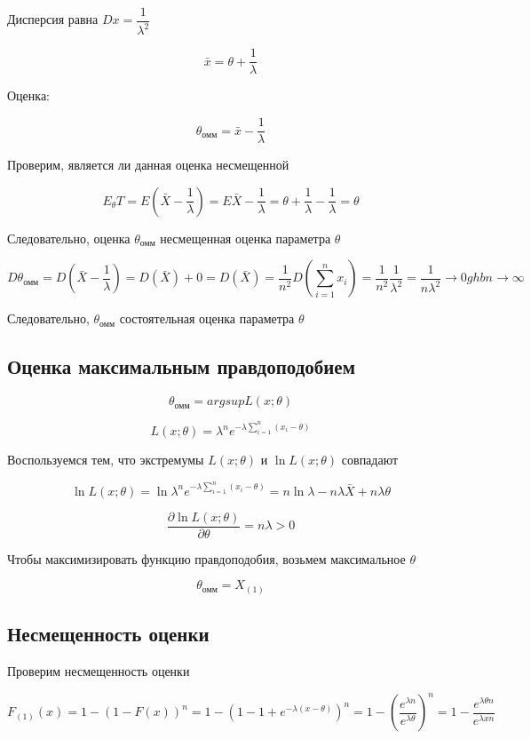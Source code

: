 \documentclass[a4paper,12pt, oneside]{book}
\begin{document}
Дисперсия равна $ Dx = \dfrac{1}{\lambda^2} $

$$
\bar{x} = \theta + \dfrac{1}{\lambda}
$$

Оценка: 

$$
\theta_\text{омм} = \bar x - \dfrac{1}{\lambda}
$$

Проверим, является ли данная оценка несмещенной

$$
E_\theta T = E\left( \bar X - \dfrac{1}{\lambda} \right) = E\bar{X} - \dfrac{1}{\lambda} = \theta + \dfrac{1}{\lambda} - \dfrac{1}{\lambda} = \theta
$$

Следовательно, оценка $ \theta_\text{омм} $ несмещенная оценка параметра $ \theta $

$$
D\theta_\text{омм} = D\left( \bar X - \dfrac{1}{\lambda} \right) = D(\bar{X}) + 0 =  D(\bar{X}) = \dfrac{1}{n^2} D\left( \sum_{i=1}^{n} x_i \right) = \dfrac{1}{n^2} \dfrac{1}{\lambda^2} = \dfrac{1}{n \lambda^2} \to 0 ghb n \to \infty
$$

Следовательно, $ \theta_\text{омм} $ состоятельная оценка параметра $ \theta $
\\

\subsection{Оценка максимальным правдоподобием}

$$
\theta_\text{омм} = argsup L(x; \theta)
$$

$$
L(x;\theta) = \lambda^n e^{-\lambda \sum_{i=1}^n (x_i - \theta)}
$$

Воспользуемся тем, что экстремумы $ L(x; \theta) $ и $ \ln L(x; \theta) $ совпадают

$$
\ln L (x; \theta) = \ln \lambda^n e^{-\lambda \sum_{i=1}^n (x_i - \theta)} = n \ln \lambda - n \lambda \bar{X} + n \lambda \theta 
$$

$$
\dfrac{\partial \ln L(x; \theta)}{\partial \theta} = n \lambda > 0
$$

Чтобы максимизировать функцию правдоподобия, возьмем максимальное $ \theta $

$$
\theta_\text{омм} = X_{(1)}
$$

\subsection{Несмещенность оценки}

Проверим несмещенность оценки

$$
F_{(1)} (x) = 1 - (1 - F(x))^n = 1-(1-1+e^{- \lambda (x - \theta)})^n = 1 - \left(  \dfrac{e^{\lambda n}}{e^{\lambda \theta}} \right)^n = 1 - \dfrac{e^{\lambda \theta n}}{e^{\lambda x n}}
$$
\end{document}

